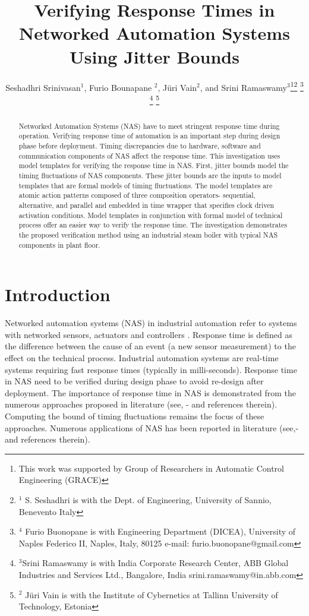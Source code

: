 \documentclass[letterpaper, 10 pt, conference]{ieeeconf}
\title{Verifying Response Times in Networked Automation Systems Using Jitter Bounds}
\author{Seshadhri Srinivasan$^{1}$, Furio Bounapane $^{2}$, J\"{u}ri Vain$^{2}$,  and Srini Ramaswamy$^{3}$\thanks{This work was supported by Group of Researchers in Automatic Control Engineering (GRACE)}\thanks{$^{1}$ S. Seshadhri is with the  Dept. of Engineering, University of Sannio, Benevento Italy}
\thanks{$^{4}$ Furio Buonopane is with Engineering Department (DICEA), University of Naples Federico II, Naples, Italy, 80125
e-mail: furio.buonopane@gmail.com}
\thanks{$^{3}$Srini Ramaswamy is with India Corporate Research Center, ABB Global Industries and Services Ltd., Bangalore, India 
srini.ramaswamy@in.abb.com}
\thanks{$^{2}$ J\"{u}ri Vain is with the Institute of Cybernetics at Tallinn University of Technology, Estonia}
}
\begin{document}
\maketitle
\thispagestyle{empty}
\pagestyle{empty}



\begin{abstract}
Networked Automation Systems (NAS) have to meet stringent response time during operation. Verifying response time of automation is an important step during design phase before deployment. Timing discrepancies due to hardware, software and communication components of NAS affect the response time. This investigation uses model templates for verifying the response time in NAS. First, jitter bounds model the timing fluctuations of NAS components. These jitter bounds are the inputs to model templates that are formal models of timing fluctuations. The model templates are atomic action patterns composed of three composition operators- sequential, alternative, and parallel and embedded in time wrapper that specifies clock driven activation conditions. Model templates in conjunction with formal model of technical process offer an easier way to verify the response time. The investigation demonstrates the proposed verification method using an industrial steam boiler with typical NAS components in plant floor. 





















\end{abstract}

\IEEEpeerreviewmaketitle
\section{Introduction}
Networked automation systems (NAS) in industrial automation refer to systems with networked sensors, actuators and controllers \cite{Vogel2012}. Response time is defined as the difference between the cause of an event (a new sensor measurement) to the effect on the technical process. Industrial automation systems are real-time systems requiring fast response times (typically in milli-seconds). Response time in NAS need to be verified during design phase to avoid re-design after deployment. The importance of response time in NAS is demonstrated from the numerous approaches proposed in literature (see, \cite{Pereira2004}-\cite{Addad2010} and references therein). Computing the bound of timing fluctuations remains the focus of these approaches. Numerous applications of NAS has been reported in literature (see,\cite{SeshCC}-\cite{Ganesh2014} and references therein).
\end{document}

